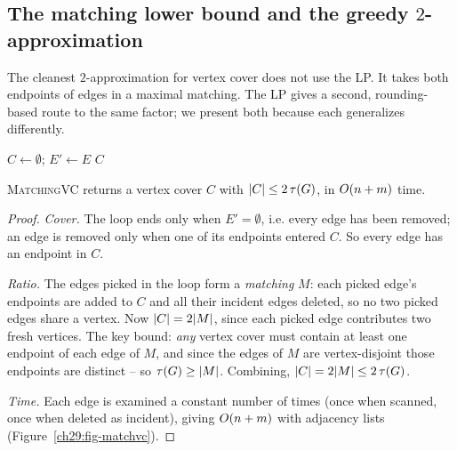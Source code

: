 \subsection{The matching lower bound and the greedy $2$-approximation}

The cleanest $2$-approximation for vertex cover does not use the LP. It takes both endpoints of edges in a maximal matching. The LP gives a second,
rounding-based route to the same factor; we present both because each generalizes
differently.

\begin{algorithm}[H]
\caption{\textsc{MatchingVC}$(\Gph)$ -- $2$-approximate vertex cover}
\label{ch29:alg-matchvc}
\DontPrintSemicolon
$C\leftarrow\emptyset$; $E'\leftarrow E$\;
\Return $C$\;
\end{algorithm}

\begin{lemma}
\label{ch29:lem-matchvc}
\textsc{MatchingVC} returns a vertex cover $C$ with $\lvert C\rvert\le 2\,\tau(G)$, in
$O(n+m)$ time.
\end{lemma}

\begin{proof}
\emph{Cover.} The loop ends only when $E'=\emptyset$, i.e. every edge has been
removed; an edge is removed only when one of its endpoints entered $C$. So every
edge has an endpoint in $C$.

\emph{Ratio.} The edges picked in the loop form a \emph{matching} $M$: each
picked edge's endpoints are added to $C$ and all their incident edges deleted, so
no two picked edges share a vertex. Now $\lvert C\rvert=2\lvert M\rvert$, since each picked edge
contributes two fresh vertices. The key bound: \emph{any} vertex cover must
contain at least one endpoint of each edge of $M$, and since the edges of $M$ are
vertex-disjoint those endpoints are distinct -- so $\tau(G)\ge\lvert M\rvert$.
Combining, $\lvert C\rvert=2\lvert M\rvert\le 2\,\tau(G)$.

\emph{Time.} Each edge is examined a constant number of times (once when scanned,
once when deleted as incident), giving $O(n+m)$ with adjacency lists (Figure~\ref{ch29:fig-matchvc}).
\end{proof}

